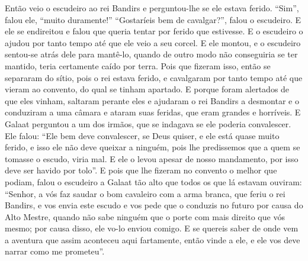 Então veio o escudeiro ao rei Bandirs e perguntou-lhe se ele estava ferido.
“Sim”, falou ele, “muito duramente!” “Gostaríeis bem de cavalgar?”, falou o
escudeiro. E ele se endireitou e falou que queria tentar por ferido que
estivesse. E o escudeiro o ajudou por tanto tempo até que ele veio a seu
corcel. E ele montou, e o escudeiro sentou-se atrás dele para mantê-lo, quando
de outro modo não conseguiria se ter mantido, teria certamente caído por terra.
Pois que fizeram isso, então se separaram do sítio, pois o rei estava ferido, e
cavalgaram por tanto tempo até que vieram ao convento, do qual se tinham
apartado. E porque foram alertados de que eles vinham, saltaram perante eles e
ajudaram o rei Bandirs a desmontar e o conduziram a uma câmara e ataram suas
feridas, que eram grandes e horríveis. E Galaat perguntou a um dos irmãos, que
se indagava se ele poderia convalescer. Ele falou: “Ele bem deve convalescer,
se Deus quiser, e ele está quase muito ferido, e isso ele não deve queixar a
ninguém, pois lhe predissemos que a quem se tomasse o escudo, viria mal. E ele
o levou apesar de nosso mandamento, por isso deve ser havido por tolo”. E pois
que lhe fizeram no convento o melhor que podiam, falou o escudeiro a Galaat tão
alto que todos os que lá estavam ouviram: “Senhor, a vós faz saudar o bom
cavaleiro com a arma branca, que feriu o rei Bandirs, e vos envia este escudo e
vos pede que o conduzis no futuro por causa do Alto Mestre, quando não sabe
ninguém que o porte com mais direito que vós mesmo; por causa disso, ele vo-lo
enviou comigo. E se quereis saber de onde vem a aventura que assim aconteceu
aqui fartamente, então vinde a ele, e ele vos deve narrar como me prometeu”.  

